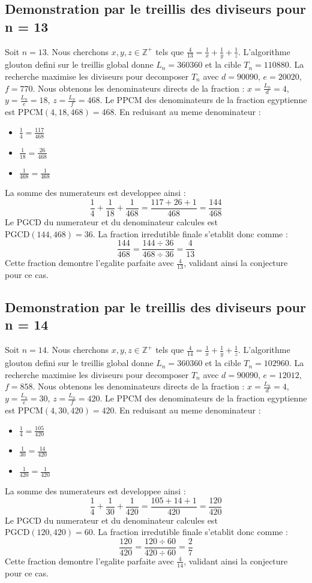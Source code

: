 \documentclass[11pt,a4paper]{article}
\begin{document}
\subsection{Demonstration par le treillis des diviseurs pour n = 13}
Soit $n = 13$. Nous cherchons $x, y, z \in \mathbb{Z}^{+}$ tels que $\frac{4}{13} = \frac{1}{x} + \frac{1}{y} + \frac{1}{z}$.
L'algorithme glouton defini sur le treillis global donne $L_n = 360360$ et la cible $T_n = 110880$.
La recherche maximise les diviseurs pour decomposer $T_n$ avec $d = 90090$, $e = 20020$, $f = 770$.
Nous obtenons les denominateurs directs de la fraction : $x = \frac{L_n}{d} = 4$, $y = \frac{L_n}{e} = 18$, $z = \frac{L_n}{f} = 468$.
Le PPCM des denominateurs de la fraction egyptienne est $\text{PPCM}(4, 18, 468) = 468$.
En reduisant au meme denominateur :
\begin{itemize}
    \item $\frac{1}{4} = \frac{117}{468}$
    \item $\frac{1}{18} = \frac{26}{468}$
    \item $\frac{1}{468} = \frac{1}{468}$
\end{itemize}
La somme des numerateurs est developpee ainsi :
$$ \frac{1}{4} + \frac{1}{18} + \frac{1}{468} = \frac{117 + 26 + 1}{468} = \frac{144}{468} $$
Le PGCD du numerateur et du denominateur calcules est $\text{PGCD}(144, 468) = 36$.
La fraction irredutible finale s'etablit donc comme :
$$ \frac{144}{468} = \frac{144 \div 36}{468 \div 36} = \frac{4}{13} $$
Cette fraction demontre l'egalite parfaite avec $\frac{4}{13}$, validant ainsi la conjecture pour ce cas.

\subsection{Demonstration par le treillis des diviseurs pour n = 14}
Soit $n = 14$. Nous cherchons $x, y, z \in \mathbb{Z}^{+}$ tels que $\frac{4}{14} = \frac{1}{x} + \frac{1}{y} + \frac{1}{z}$.
L'algorithme glouton defini sur le treillis global donne $L_n = 360360$ et la cible $T_n = 102960$.
La recherche maximise les diviseurs pour decomposer $T_n$ avec $d = 90090$, $e = 12012$, $f = 858$.
Nous obtenons les denominateurs directs de la fraction : $x = \frac{L_n}{d} = 4$, $y = \frac{L_n}{e} = 30$, $z = \frac{L_n}{f} = 420$.
Le PPCM des denominateurs de la fraction egyptienne est $\text{PPCM}(4, 30, 420) = 420$.
En reduisant au meme denominateur :
\begin{itemize}
    \item $\frac{1}{4} = \frac{105}{420}$
    \item $\frac{1}{30} = \frac{14}{420}$
    \item $\frac{1}{420} = \frac{1}{420}$
\end{itemize}
La somme des numerateurs est developpee ainsi :
$$ \frac{1}{4} + \frac{1}{30} + \frac{1}{420} = \frac{105 + 14 + 1}{420} = \frac{120}{420} $$
Le PGCD du numerateur et du denominateur calcules est $\text{PGCD}(120, 420) = 60$.
La fraction irredutible finale s'etablit donc comme :
$$ \frac{120}{420} = \frac{120 \div 60}{420 \div 60} = \frac{2}{7} $$
Cette fraction demontre l'egalite parfaite avec $\frac{4}{14}$, validant ainsi la conjecture pour ce cas.
\end{document}
